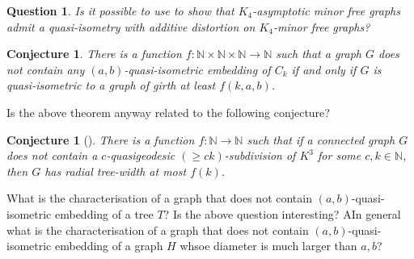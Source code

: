 \documentclass[a4paper]{article}
\newtheorem{Question}{Question}
\newtheorem{conjecture}[theorem]{Conjecture}
\begin{document}
 
 
 
 \begin{Question}
 	Is it possible to use  to show that $K_4$-asymptotic minor free graphs admit a quasi-isometry with additive distortion on $K_4$-minor free graphs?
 \end{Question}
 

 
% 
 
  \begin{conjecture}\label{lem:cycle}
 	There is a function $f\colon \mathbb{N}\times \mathbb{N} \times \mathbb{N} \rightarrow \mathbb{N}$ such that a graph $G$  does not contain any $(a,b)$-quasi-isometric embedding of $C_k$ if and only if $G$ is quasi-isometric to a graph of girth at least $f(k,a,b)$.
 \end{conjecture}
 
 Is the above theorem anyway related to the following conjecture?
 
 \begin{conjecture}[\cite{albrechtsen2023structural}]
There is a function $f\colon \mathbb{N} \rightarrow \mathbb{N}$ such that if a connected graph $G$ does not contain a $c$-quasigeodesic $(\geq ck)$-subdivision of $K^3$ for some $c,k \in \mathbb{N}$, then $G$ has radial tree-width at most $f(k)$. 
 \end{conjecture}


	What is the characterisation of a graph that does not contain $(a,b)$-quasi-isometric embedding of a tree $T$? Is the above question interesting? AIn general what is the characterisation of a graph that does not contain $(a,b)$-quasi-isometric embedding of a graph $H$ whsoe diameter is much larger than $a,b$? 
%
 
\end{document}
